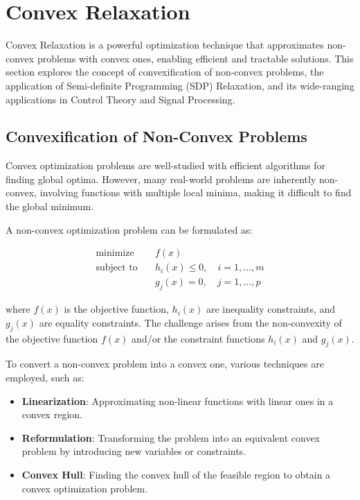\documentclass[12pt]{book} %
\begin{document}
\section{Convex Relaxation}

Convex Relaxation is a powerful optimization technique that approximates non-convex problems with convex ones, enabling efficient and tractable solutions. This section explores the concept of convexification of non-convex problems, the application of Semi-definite Programming (SDP) Relaxation, and its wide-ranging applications in Control Theory and Signal Processing.

\subsection{Convexification of Non-Convex Problems}

Convex optimization problems are well-studied with efficient algorithms for finding global optima. However, many real-world problems are inherently non-convex, involving functions with multiple local minima, making it difficult to find the global minimum.

A non-convex optimization problem can be formulated as:

\begin{align*}
\text{minimize} \quad & f(x) \\
\text{subject to} \quad & h_i(x) \leq 0, \quad i = 1, \ldots, m \\
& g_j(x) = 0, \quad j = 1, \ldots, p
\end{align*}

where \(f(x)\) is the objective function, \(h_i(x)\) are inequality constraints, and \(g_j(x)\) are equality constraints. The challenge arises from the non-convexity of the objective function \(f(x)\) and/or the constraint functions \(h_i(x)\) and \(g_j(x)\).

To convert a non-convex problem into a convex one, various techniques are employed, such as:

\begin{itemize}
    \item \textbf{Linearization}: Approximating non-linear functions with linear ones in a convex region.
    \item \textbf{Reformulation}: Transforming the problem into an equivalent convex problem by introducing new variables or constraints.
    \item \textbf{Convex Hull}: Finding the convex hull of the feasible region to obtain a convex optimization problem.
\end{itemize}
\end{document}
